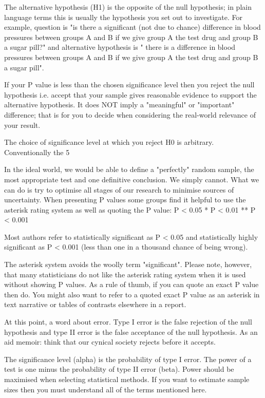The alternative hypothesis (H1) is the opposite of the null hypothesis; in plain language terms this is usually the hypothesis you set out to investigate. For example, question is "is there a significant (not due to chance) difference in blood pressures between groups A and B if we give group A the test drug and group B a sugar pill?" and alternative hypothesis is " there is a difference in blood pressures between groups A and B if we give group A the test drug and group B a sugar pill".
 
If your P value is less than the chosen significance level then you reject the null hypothesis i.e. accept that your sample gives reasonable evidence to support the alternative hypothesis. It does NOT imply a "meaningful" or "important" difference; that is for you to decide when considering the real-world relevance of your result.
 
The choice of significance level at which you reject H0 is arbitrary. Conventionally the 5%
 
In the ideal world, we would be able to define a "perfectly" random sample, the most appropriate test and one definitive conclusion. We simply cannot. What we can do is try to optimise all stages of our research to minimise sources of uncertainty. When presenting P values some groups find it helpful to use the asterisk rating system as well as quoting the P value:
P < 0.05 *
P < 0.01 **
P < 0.001
 
Most authors refer to statistically significant as P < 0.05 and statistically highly significant as P < 0.001 (less than one in a thousand chance of being wrong).
 
The asterisk system avoids the woolly term "significant". Please note, however, that many statisticians do not like the asterisk rating system when it is used without showing P values. As a rule of thumb, if you can quote an exact P value then do. You might also want to refer to a quoted exact P value as an asterisk in text narrative or tables of contrasts elsewhere in a report.
 
At this point, a word about error. Type I error is the false rejection of the null hypothesis and type II error is the false acceptance of the null hypothesis. As an aid memoir: think that our cynical society rejects before it accepts.
 
The significance level (alpha) is the probability of type I error. The power of a test is one minus the probability of type II error (beta). Power should be maximised when selecting statistical methods. If you want to estimate sample sizes then you must understand all of the terms mentioned here.
 
